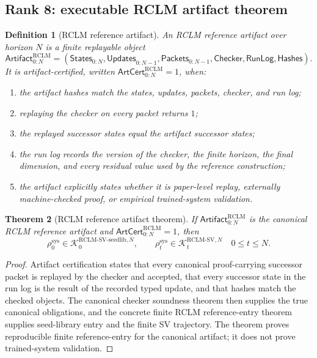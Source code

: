 \documentclass[11pt,a4paper]{article}
\newtheorem{theorem}{Theorem}[section]
\newtheorem{definition}[theorem]{Definition}
\newcommand{\Kcal}{\mathcal K}
\newcommand{\RCLM}{\mathrm{RCLM}}
\newcommand{\sys}{\mathrm{sys}}
\begin{document}
\subsection{Rank 8: executable RCLM artifact theorem}

\begin{definition}[RCLM reference artifact]
\label{def:rclm-batch13r-reference-artifact}
An RCLM reference artifact over horizon \(N\) is a finite replayable object
\[
\mathsf{Artifact}_{0:N}^{\RCLM}
=
(\mathsf{States}_{0:N},\mathsf{Updates}_{0:N-1},\mathsf{Packets}_{0:N-1},\mathsf{Checker},\mathsf{RunLog},\mathsf{Hashes}).
\]
It is artifact-certified, written \(\mathsf{ArtCert}_{0:N}^{\RCLM}=1\), when:
\begin{enumerate}[label=(\roman*),leftmargin=1.5em]
    \item the artifact hashes match the states, updates, packets, checker, and run log;
    \item replaying the checker on every packet returns \(1\);
    \item the replayed successor states equal the artifact successor states;
    \item the run log records the version of the checker, the finite horizon, the final dimension, and every residual value used by the reference construction;
    \item the artifact explicitly states whether it is paper-level replay, externally machine-checked proof, or empirical trained-system validation.
\end{enumerate}
\end{definition}

\begin{theorem}[RCLM reference artifact theorem]
\label{thm:rclm-batch13r-reference-artifact-theorem}
If \(\mathsf{Artifact}_{0:N}^{\RCLM}\) is the canonical RCLM reference artifact and \(\mathsf{ArtCert}_{0:N}^{\RCLM}=1\), then
\[
\rho_0^{\sys}
\in
\Kcal_0^{\RCLM\text{-}\mathrm{SV\mbox{-}seedlib},N},
\qquad
\rho_t^{\sys}
\in
\Kcal_t^{\RCLM\text{-}\mathrm{SV},N}
\quad
0\le t\le N.
\]
\end{theorem}

\begin{proof}
Artifact certification states that every canonical proof-carrying successor packet is replayed by the checker and accepted, that every successor state in the run log is the result of the recorded typed update, and that hashes match the checked objects.  The canonical checker soundness theorem then supplies the true canonical obligations, and the concrete finite RCLM reference-entry theorem supplies seed-library entry and the finite SV trajectory.  The theorem proves reproducible finite reference-entry for the canonical artifact; it does not prove trained-system validation.
\end{proof}
\end{document}
